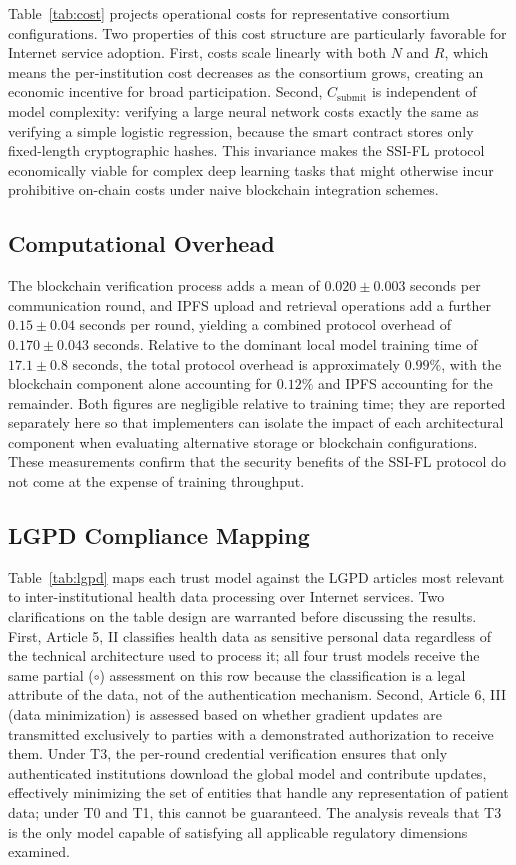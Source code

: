 \documentclass{sbc2023}
\begin{document}
Table~\ref{tab:cost} projects operational costs for representative consortium configurations. Two properties of this cost structure are particularly favorable for Internet service adoption. First, costs scale linearly with both $N$ and $R$, which means the per-institution cost decreases as the consortium grows, creating an economic incentive for broad participation. Second, $C_{\text{submit}}$ is independent of model complexity: verifying a large neural network costs exactly the same as verifying a simple logistic regression, because the smart contract stores only fixed-length cryptographic hashes. This invariance makes the SSI-FL protocol economically viable for complex deep learning tasks that might otherwise incur prohibitive on-chain costs under naive blockchain integration schemes.

\subsection{Computational Overhead}

The blockchain verification process adds a mean of $0.020 \pm 0.003$ seconds per communication round, and IPFS upload and retrieval operations add a further $0.15 \pm 0.04$ seconds per round, yielding a combined protocol overhead of $0.170 \pm 0.043$ seconds. Relative to the dominant local model training time of $17.1 \pm 0.8$ seconds, the total protocol overhead is approximately $0.99\%$, with the blockchain component alone accounting for $0.12\%$ and IPFS accounting for the remainder. Both figures are negligible relative to training time; they are reported separately here so that implementers can isolate the impact of each architectural component when evaluating alternative storage or blockchain configurations. These measurements confirm that the security benefits of the SSI-FL protocol do not come at the expense of training throughput.

\subsection{LGPD Compliance Mapping}

Table~\ref{tab:lgpd} maps each trust model against the LGPD articles most relevant to inter-institutional health data processing over Internet services. Two clarifications on the table design are warranted before discussing the results. First, Article 5, II classifies health data as sensitive personal data regardless of the technical architecture used to process it; all four trust models receive the same partial ($\circ$) assessment on this row because the classification is a legal attribute of the data, not of the authentication mechanism. Second, Article 6, III (data minimization) is assessed based on whether gradient updates are transmitted exclusively to parties with a demonstrated authorization to receive them. Under T3, the per-round credential verification ensures that only authenticated institutions download the global model and contribute updates, effectively minimizing the set of entities that handle any representation of patient data; under T0 and T1, this cannot be guaranteed. The analysis reveals that T3 is the only model capable of satisfying all applicable regulatory dimensions examined.
\end{document}
